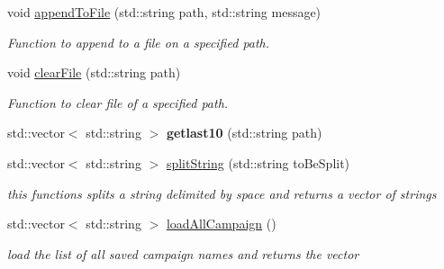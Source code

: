 \begin{DoxyCompactItemize}
\hypertarget{class_singleton_input_output_manager_a5ac64eaf096e7d273b3eb1e179ef86f1}{}\label{class_singleton_input_output_manager_a5ac64eaf096e7d273b3eb1e179ef86f1} 
void \hyperlink{class_singleton_input_output_manager_a5ac64eaf096e7d273b3eb1e179ef86f1}{append\+To\+File} (std\+::string path, std\+::string message)
\begin{DoxyCompactList}\small\item\em Function to append to a file on a specified path. \end{DoxyCompactList}\item 
\hypertarget{class_singleton_input_output_manager_a9e02bb9889af682cad2c5c932c8b1654}{}\label{class_singleton_input_output_manager_a9e02bb9889af682cad2c5c932c8b1654} 
void \hyperlink{class_singleton_input_output_manager_a9e02bb9889af682cad2c5c932c8b1654}{clear\+File} (std\+::string path)
\begin{DoxyCompactList}\small\item\em Function to clear file of a specified path. \end{DoxyCompactList}\item 
\hypertarget{class_singleton_input_output_manager_a8d63ee2cd854b8f565f0b60d6a2b68fa}{}\label{class_singleton_input_output_manager_a8d63ee2cd854b8f565f0b60d6a2b68fa} 
std\+::vector$<$ std\+::string $>$ {\bfseries getlast10} (std\+::string path)
\item 
\hypertarget{class_singleton_input_output_manager_aadd629b10aed904e41a0bc23fae7d232}{}\label{class_singleton_input_output_manager_aadd629b10aed904e41a0bc23fae7d232} 
std\+::vector$<$ std\+::string $>$ \hyperlink{class_singleton_input_output_manager_aadd629b10aed904e41a0bc23fae7d232}{split\+String} (std\+::string to\+Be\+Split)
\begin{DoxyCompactList}\small\item\em this functions splits a string delimited by space and returns a vector of strings \end{DoxyCompactList}\item 
\hypertarget{class_singleton_input_output_manager_afaac41ad14f6a7754d33db8b06a46e50}{}\label{class_singleton_input_output_manager_afaac41ad14f6a7754d33db8b06a46e50} 
std\+::vector$<$ std\+::string $>$ \hyperlink{class_singleton_input_output_manager_afaac41ad14f6a7754d33db8b06a46e50}{load\+All\+Campaign} ()
\begin{DoxyCompactList}\small\item\em load the list of all saved campaign names and returns the vector \end{DoxyCompactList}\item 

\end{DoxyCompactItemize}
